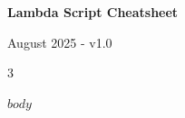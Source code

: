 \documentclass[10pt,a4paper,oneside]{article}
\begin{document}
\begin{center}
{\Large \textbf{Lambda Script Cheatsheet}}
\end{center}
\vspace{-8pt}
\begin{flushright}
{\small August 2025 - v1.0}
\end{flushright}

\vspace{3pt}

\begin{multicols*}{3}
\raggedright
$body$
\end{multicols*}
\end{document}
